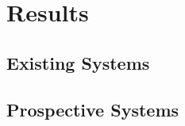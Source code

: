 \section{Results}\label{sec:results}

\subsection{Existing Systems}

\subsection{Prospective Systems}


